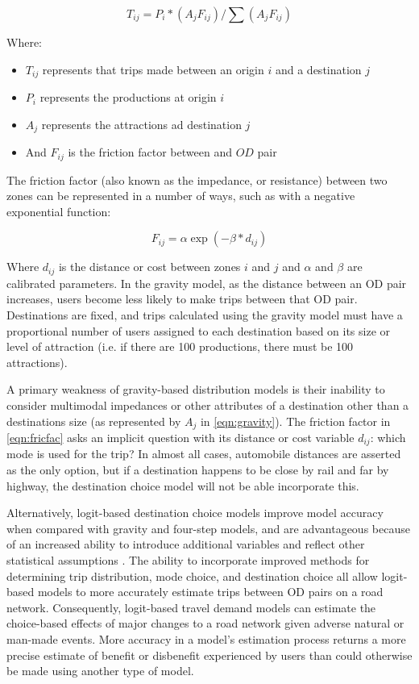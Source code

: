 \begin{equation}
T_{ij}= P_i*(A_j F_{ij})/\sum(A_j F_{ij})
 \label{eqn:gravity}
\end{equation}

Where:
\begin{itemize}
	\item 	$T_{ij}$ represents that trips made between an origin $i$ and a
  destination $j$
	\item $P_i$ represents the productions at origin $i$
	\item $A_j$ represents the attractions ad destination $j$
	\item And $F_{ij}$ is the friction factor between and $OD$ pair
\end{itemize}

The friction factor (also known as the impedance, or resistance) between two
zones can be represented in a number of ways, such as with a negative
exponential function:

\begin{equation}
	F_{ij} = \alpha \exp(-\beta * d_{ij})
  \label{eqn:fricfac}
\end{equation}

Where $d_{ij}$ is the distance or cost between zones $i$ and $j$ and $\alpha$
and $\beta$ are calibrated parameters. In the gravity model, as the distance
between an OD pair increases, users become less likely to make trips between
that OD pair. Destinations are fixed, and trips calculated using the
gravity model must have a proportional number of users assigned to each
destination based on its size or level of attraction (i.e. if there are 100
productions, there must be 100 attractions).

A primary weakness of gravity-based distribution models is their inability to
consider multimodal impedances or other attributes of a destination other than
a destinations size (as represented by $A_j$ in \ref{eqn:gravity}). The
friction factor in \ref{eqn:fricfac} asks an implicit question with its
distance or cost variable $d_{ij}$: which mode is used for the trip? In almost
all cases, automobile distances are asserted as the only option, but if a
destination happens to be close by rail and far by highway, the destination
choice model will not be able incorporate this.

Alternatively, logit-based destination choice models improve model accuracy
when compared with gravity and four-step models, and are advantageous because
of an increased ability to introduce additional variables and reflect other
statistical assumptions \cite{tfr2021}. The ability to incorporate improved
methods for determining trip distribution, mode choice, and destination choice
all allow logit-based models to more accurately estimate trips between OD
pairs on a road network. Consequently, logit-based travel demand models
can estimate the choice-based effects of major changes to a road network given
adverse natural or man-made events. More accuracy in a model’s estimation
process returns a more precise estimate of benefit or disbenefit experienced
by users than could otherwise be made using another type of model.

